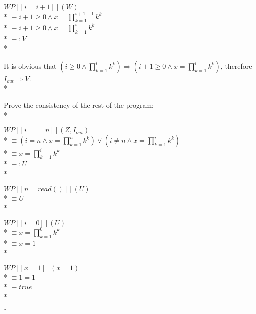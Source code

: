 \documentclass{article}
\begin{document}
$ WP[\![i=i+1]\!](W) $ \\*
$ \equiv i+1\ge 0 \land x=\prod_{k=1}^{i+1-1} k^k $ \\*
$ \equiv i+1\ge 0 \land x=\prod_{k=1}^{i} k^k $ \\*
$ \equiv: V $ \\*

It is obvious that $ (i\ge 0 \land \prod_{k=1}^{i} k^k) \Rightarrow (i+1\ge 0 \land x=\prod_{k=1}^{i} k^k) $, therefore $ I_{out} \Rightarrow V $. \\*

Prove the consistency of the rest of the program: \\*

$ WP[\![i==n]\!](Z, I_{out}) $ \\*
$ \equiv (i=n \land x=\prod_{k=1}^{n} k^k) \lor (i\ne n \land x=\prod_{k=1}^{i} k^k) $ \\*
$ \equiv x=\prod_{k=1}^{i} k^k $ \\*
$ \equiv: U $ \\*

$ WP[\![n=read()]\!](U) $ \\*
$ \equiv U $ \\*

$ WP[\![i=0]\!](U) $ \\*
$ \equiv x=\prod_{k=1}^{0} k^k $ \\*
$ \equiv x=1 $ \\*

$ WP[\![x=1]\!](x=1) $ \\*
$ \equiv 1=1 $ \\*
$ \equiv true $ \\*

$ \square $
\end{document}
